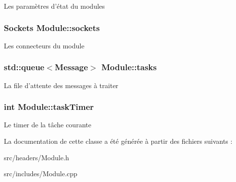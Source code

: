 Les paramètres d'état du modules \hypertarget{classModule_af0415ddaab230958f91665c66b078085}{
\subsubsection[{sockets}]{\setlength{\rightskip}{0pt plus 5cm}Sockets Module\-::sockets\hspace{0.3cm}{\ttfamily [protected]}}}\label{classModule_af0415ddaab230958f91665c66b078085}
Les connecteurs du module \hypertarget{classModule_aeace7c2bfd88f9946a25fb06974ca522}{
\subsubsection[{tasks}]{\setlength{\rightskip}{0pt plus 5cm}std\-::queue$<${\bf Message}$>$ Module\-::tasks\hspace{0.3cm}{\ttfamily [protected]}}}\label{classModule_aeace7c2bfd88f9946a25fb06974ca522}
La file d'attente des messages à traiter \hypertarget{classModule_afc209c4f9120425219f7775c79cf4bea}{
\subsubsection[{task\-Timer}]{\setlength{\rightskip}{0pt plus 5cm}int Module\-::task\-Timer\hspace{0.3cm}{\ttfamily [protected]}}}\label{classModule_afc209c4f9120425219f7775c79cf4bea}
Le timer de la tâche courante 

La documentation de cette classe a été générée à partir des fichiers suivants \-:\begin{DoxyCompactItemize}
\item 
src/headers/Module.\-h\item 
src/includes/Module.\-cpp\end{DoxyCompactItemize}
